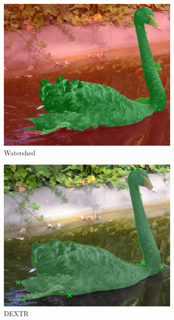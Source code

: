 \begin{figure}
\begin{subfigure}[t]{0.3\textwidth}
		\includegraphics[width=\textwidth]{figures/appendix/method_predictions/swan34_watershed.png}
		\caption{
			Watershed
		}
	\end{subfigure}
	\hfill
	\begin{subfigure}[t]{0.3\textwidth}
		\centering
		\includegraphics[width=\textwidth]{figures/appendix/method_predictions/swan34_dextr.png}
		\caption{
			DEXTR
		}
	\end{subfigure}
	\hfill
	\begin{subfigure}[t]{0.3\textwidth}

\end{subfigure}
\end{figure}
